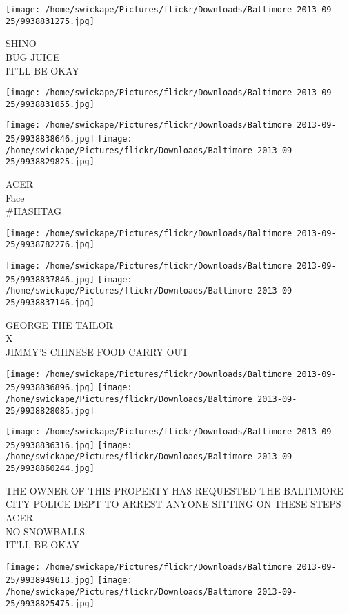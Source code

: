 \documentclass[10pt,letterpaper]{article}
\begin{document}
\vspace{0.25in}
\texttt{[image: /home/swickape/Pictures/flickr/Downloads/Baltimore 2013-09-25/9938831275.jpg]}

SHINO\\
BUG JUICE\\
IT'LL BE OKAY
\pagebreak

\texttt{[image: /home/swickape/Pictures/flickr/Downloads/Baltimore 2013-09-25/9938831055.jpg]}

\vspace{0.25in}
\texttt{[image: /home/swickape/Pictures/flickr/Downloads/Baltimore 2013-09-25/9938838646.jpg]}
\texttt{[image: /home/swickape/Pictures/flickr/Downloads/Baltimore 2013-09-25/9938829825.jpg]}

ACER\\
Face\\
\#HASHTAG
\pagebreak

\texttt{[image: /home/swickape/Pictures/flickr/Downloads/Baltimore 2013-09-25/9938782276.jpg]}

\vspace{0.25in}
\texttt{[image: /home/swickape/Pictures/flickr/Downloads/Baltimore 2013-09-25/9938837846.jpg]}
\texttt{[image: /home/swickape/Pictures/flickr/Downloads/Baltimore 2013-09-25/9938837146.jpg]}

GEORGE THE TAILOR\\
X\\
JIMMY'S CHINESE FOOD CARRY OUT
\pagebreak

\texttt{[image: /home/swickape/Pictures/flickr/Downloads/Baltimore 2013-09-25/9938836896.jpg]}
\texttt{[image: /home/swickape/Pictures/flickr/Downloads/Baltimore 2013-09-25/9938828085.jpg]}

\texttt{[image: /home/swickape/Pictures/flickr/Downloads/Baltimore 2013-09-25/9938836316.jpg]}
\texttt{[image: /home/swickape/Pictures/flickr/Downloads/Baltimore 2013-09-25/9938860244.jpg]}

THE OWNER OF THIS PROPERTY HAS REQUESTED THE BALTIMORE CITY POLICE DEPT TO ARREST ANYONE SITTING ON THESE STEPS\\
ACER\\
NO SNOWBALLS\\
IT'LL BE OKAY
\pagebreak

\texttt{[image: /home/swickape/Pictures/flickr/Downloads/Baltimore 2013-09-25/9938949613.jpg]}
\texttt{[image: /home/swickape/Pictures/flickr/Downloads/Baltimore 2013-09-25/9938825475.jpg]}
\end{document}
